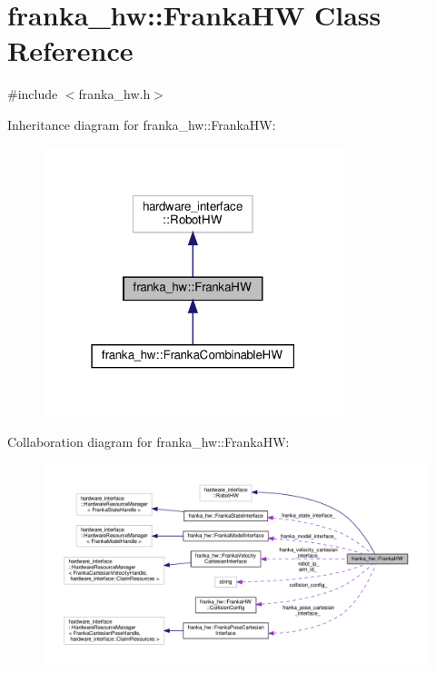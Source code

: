 \hypertarget{classfranka__hw_1_1_franka_h_w}{}\section{franka\+\_\+hw\+:\+:Franka\+HW Class Reference}
\label{classfranka__hw_1_1_franka_h_w}


{\ttfamily \#include $<$franka\+\_\+hw.\+h$>$}



Inheritance diagram for franka\+\_\+hw\+:\+:Franka\+HW\+:
\nopagebreak
\begin{figure}[H]
\begin{center}
\leavevmode
\includegraphics[width=247pt]{classfranka__hw_1_1_franka_h_w__inherit__graph}
\end{center}
\end{figure}


Collaboration diagram for franka\+\_\+hw\+:\+:Franka\+HW\+:
\nopagebreak
\begin{figure}[H]
\begin{center}
\leavevmode
\includegraphics[width=350pt]{classfranka__hw_1_1_franka_h_w__coll__graph}
\end{center}
\end{figure}
